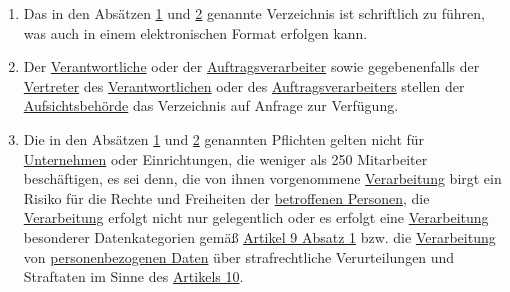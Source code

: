 \begin{enumerate}
\begin{enumerate}
  \end{enumerate}

  \item Das in den Absätzen \hyperref[itm:30-1]{1} und \hyperref[itm:30-2]{2} genannte Verzeichnis ist schriftlich zu
   führen, was auch in einem elektronischen Format erfolgen kann.
  \label{itm:30-3}

  \item Der \hyperref[itm:04-7]{Verantwortliche} oder der \hyperref[itm:04-8]{Auftragsverarbeiter} sowie gegebenenfalls
   der \hyperref[itm:04-17]{Vertreter} des \hyperref[itm:04-7]{Verantwortlichen} oder des \hyperref[itm:04-8]
   {Auftragsverarbeiters} stellen der \hyperref[itm:04-21]{Aufsichtsbehörde} das Verzeichnis auf Anfrage zur
   Verfügung.
  \label{itm:30-4}

  \item Die in den Absätzen \hyperref[itm:30-1]{1} und \hyperref[itm:30-2]{2} genannten Pflichten gelten nicht für
   \hyperref[itm:04-18]{Unternehmen} oder Einrichtungen, die weniger als 250 Mitarbeiter beschäftigen, es sei denn, die
    von ihnen vorgenommene \hyperref[itm:04-2]{Verarbeitung} birgt ein Risiko für die Rechte und Freiheiten
    der \hyperref[itm:04-1]{betroffenen Personen}, die \hyperref[itm:04-2]{Verarbeitung} erfolgt nicht nur gelegentlich
    oder es erfolgt eine \hyperref[itm:04-2]{Verarbeitung} besonderer Datenkategorien gemäß \hyperref[itm:09-1]
    {Artikel 9 Absatz 1} bzw. die \hyperref[itm:04-2]{Verarbeitung} von \hyperref[itm:04-1]{personenbezogenen Daten}
    über strafrechtliche Verurteilungen und Straftaten im Sinne des \hyperref[ch:10]{Artikels 10}.


  \label{itm:30-5}

\end{enumerate}


